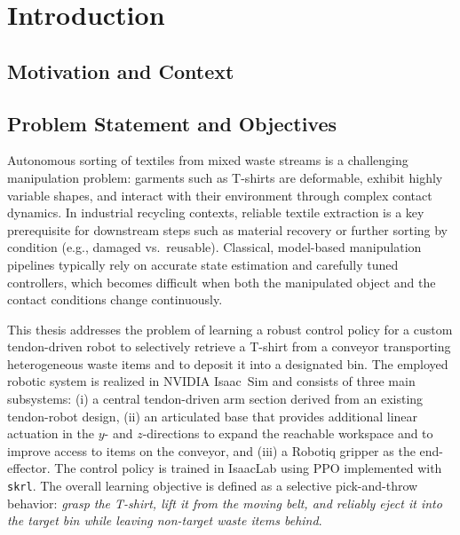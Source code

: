 \chapter{Introduction}\label{ch:introduction}


\section{Motivation and Context} %

\section{Problem Statement and Objectives} %
Autonomous sorting of textiles from mixed waste streams is a challenging manipulation problem: garments such as T-shirts are deformable, exhibit highly variable shapes, and interact with their environment through complex contact dynamics. 
In industrial recycling contexts, reliable textile extraction is a key prerequisite for downstream steps such as material recovery or further sorting by condition (e.g., damaged vs.\ reusable). 
Classical, model-based manipulation pipelines typically rely on accurate state estimation and carefully tuned controllers, which becomes difficult when both the manipulated object and the contact conditions change continuously.

This thesis addresses the problem of learning a robust control policy for a custom tendon-driven robot to selectively retrieve a T-shirt from a conveyor transporting heterogeneous waste items and to deposit it into a designated bin. 
The employed robotic system is realized in NVIDIA Isaac~Sim and consists of three main subsystems: (i) a central tendon-driven arm section derived from an existing tendon-robot design, (ii) an articulated base that provides additional linear actuation in the $y$- and $z$-directions to expand the reachable workspace and to improve access to items on the conveyor, and (iii) a Robotiq gripper as the end-effector. 
The control policy is trained in IsaacLab using \ac{PPO} implemented with \texttt{skrl}. 
The overall learning objective is defined as a selective pick-and-throw behavior: \emph{grasp the T-shirt, lift it from the moving belt, and reliably eject it into the target bin while leaving non-target waste items behind}.

